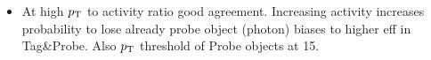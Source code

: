 \documentclass{beamer}
\begin{document}
\begin{frame}
\begin{columns}
\begin{column}{0.33\textwidth}
   \end{column}
  \end{columns}
\begin{itemize}
 \item At high $p_{\text{T}}$ to activity ratio good agreement. Increasing activity increases probability to lose already probe object (photon) biases to higher eff in Tag\&Probe. Also $p_{\text{T}}$ threshold of Probe objects at 15\gev.
\end{itemize}

\end{frame}
\end{document}
